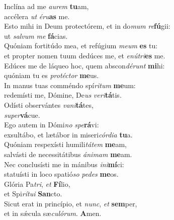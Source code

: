 \evenverse Inclína ad me \textit{au}\textit{rem} \textbf{tu}am,~\*\\
\evenverse accélera \textit{ut} \textit{é}\textit{ru}\textbf{as} me.\\
\oddverse Esto mihi in Deum protectórem, et in do\textit{mum} \textit{re}\textbf{fú}gii:~\*\\
\oddverse ut \textit{sal}\textit{vum} \textit{me} \textbf{fá}cias.\\
\evenverse Quóniam fortitúdo mea, et refúgium \textit{me}\textit{um} \textbf{es} tu:~\*\\
\evenverse et propter nomen tuum dedúces me, et \textit{e}\textit{nú}\textit{tri}\textbf{es} me.\\
\oddverse Edúces me de láqueo hoc, quem abscon\textit{dé}\textit{runt} \textbf{mi}hi:~\*\\
\oddverse quóniam tu es \textit{pro}\textit{té}\textit{ctor} \textbf{me}us.\\
\evenverse In manus tuas comméndo spí\textit{ri}\textit{tum} \textbf{me}um:~\*\\
\evenverse redemísti me, Dómine, De\textit{us} \textit{ve}\textit{ri}\textbf{tá}tis.\\
\oddverse Odísti observántes \textit{va}\textit{ni}\textbf{tá}tes,~\*\\
\oddverse \textit{su}\textit{per}\textbf{vá}cue.\\
\evenverse Ego autem in Dómi\textit{no} \textit{spe}\textbf{rá}vi:~\*\\
\evenverse exsultábo, et lætábor in miseri\textit{cór}\textit{di}\textit{a} \textbf{tu}a.\\
\oddverse Quóniam respexísti humili\textit{tá}\textit{tem} \textbf{me}am,~\*\\
\oddverse salvásti de necessitátibus \textit{á}\textit{ni}\textit{mam} \textbf{me}am.\\
\evenverse Nec conclusísti me in mánibus \textit{i}\textit{ni}\textbf{mí}ci:~\*\\
\evenverse statuísti in loco spatió\textit{so} \textit{pe}\textit{des} \textbf{me}os.\\
\oddverse Glória Pa\textit{tri}, \textit{et} \textbf{Fí}lio,~\*\\
\oddverse et Spi\textit{rí}\textit{tu}\textit{i} \textbf{San}cto.\\
\evenverse Sicut erat in princípio, et \textit{nunc}, \textit{et} \textbf{sem}per,~\*\\
\evenverse et in sǽcula sæ\textit{cu}\textit{ló}\textit{rum}. \textbf{A}men.\\
